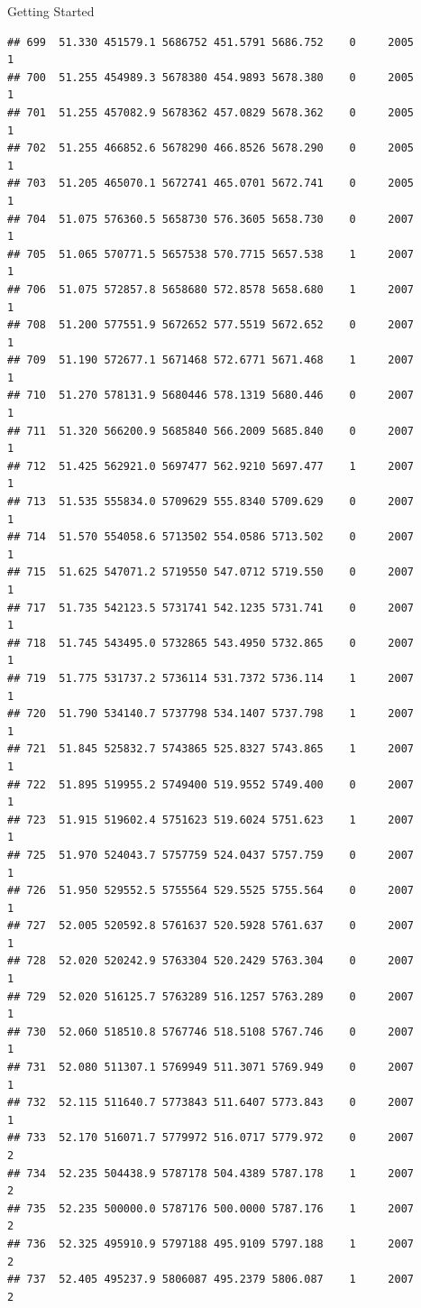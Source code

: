 \documentclass[
  ignorenonframetext,
]{beamer}
\begin{document}
\begin{frame}[fragile]{Getting Started}
\begin{verbatim}
## 699  51.330 451579.1 5686752 451.5791 5686.752    0     2005        1
## 700  51.255 454989.3 5678380 454.9893 5678.380    0     2005        1
## 701  51.255 457082.9 5678362 457.0829 5678.362    0     2005        1
## 702  51.255 466852.6 5678290 466.8526 5678.290    0     2005        1
## 703  51.205 465070.1 5672741 465.0701 5672.741    0     2005        1
## 704  51.075 576360.5 5658730 576.3605 5658.730    0     2007        1
## 705  51.065 570771.5 5657538 570.7715 5657.538    1     2007        1
## 706  51.075 572857.8 5658680 572.8578 5658.680    1     2007        1
## 708  51.200 577551.9 5672652 577.5519 5672.652    0     2007        1
## 709  51.190 572677.1 5671468 572.6771 5671.468    1     2007        1
## 710  51.270 578131.9 5680446 578.1319 5680.446    0     2007        1
## 711  51.320 566200.9 5685840 566.2009 5685.840    0     2007        1
## 712  51.425 562921.0 5697477 562.9210 5697.477    1     2007        1
## 713  51.535 555834.0 5709629 555.8340 5709.629    0     2007        1
## 714  51.570 554058.6 5713502 554.0586 5713.502    0     2007        1
## 715  51.625 547071.2 5719550 547.0712 5719.550    0     2007        1
## 717  51.735 542123.5 5731741 542.1235 5731.741    0     2007        1
## 718  51.745 543495.0 5732865 543.4950 5732.865    0     2007        1
## 719  51.775 531737.2 5736114 531.7372 5736.114    1     2007        1
## 720  51.790 534140.7 5737798 534.1407 5737.798    1     2007        1
## 721  51.845 525832.7 5743865 525.8327 5743.865    1     2007        1
## 722  51.895 519955.2 5749400 519.9552 5749.400    0     2007        1
## 723  51.915 519602.4 5751623 519.6024 5751.623    1     2007        1
## 725  51.970 524043.7 5757759 524.0437 5757.759    0     2007        1
## 726  51.950 529552.5 5755564 529.5525 5755.564    0     2007        1
## 727  52.005 520592.8 5761637 520.5928 5761.637    0     2007        1
## 728  52.020 520242.9 5763304 520.2429 5763.304    0     2007        1
## 729  52.020 516125.7 5763289 516.1257 5763.289    0     2007        1
## 730  52.060 518510.8 5767746 518.5108 5767.746    0     2007        1
## 731  52.080 511307.1 5769949 511.3071 5769.949    0     2007        1
## 732  52.115 511640.7 5773843 511.6407 5773.843    0     2007        1
## 733  52.170 516071.7 5779972 516.0717 5779.972    0     2007        2
## 734  52.235 504438.9 5787178 504.4389 5787.178    1     2007        2
## 735  52.235 500000.0 5787176 500.0000 5787.176    1     2007        2
## 736  52.325 495910.9 5797188 495.9109 5797.188    1     2007        2
## 737  52.405 495237.9 5806087 495.2379 5806.087    1     2007        2

\end{verbatim}
\end{frame}
\end{document}
